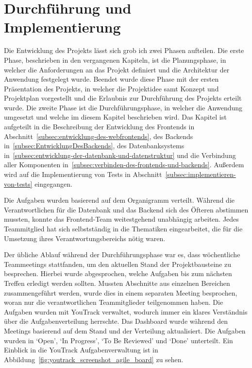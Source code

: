 \section{Durchführung und Implementierung}\label{sec:durchfuehrung-implementierung}

Die Entwicklung des Projekts lässt sich grob ich zwei Phasen aufteilen.
Die erste Phase, beschrieben in den vergangenen Kapiteln, ist die Planungsphase, in welcher die Anforderungen an das Projekt definiert und die Architektur der Anwendung festgelegt wurde.
Beendet wurde diese Phase mit der ersten Präsentation des Projekts, in welcher die Projektidee samt Konzept und Projektplan vorgestellt und die Erlaubnis zur Durchführung des Projekts erteilt wurde.
Die zweite Phase ist die Durchführungsphase, in welcher die Anwendung umgesetzt und welche im diesem Kapitel beschrieben wird.
Das Kapitel ist aufgeteilt in die Beschreibung der Entwicklung des Frontends in Abschnitt~\ref{subsec:entwicklung-des-webfrontends}, des Backends in~\ref{subsec:EntwicklungDesBackends}, des Datenbanksystems in~\ref{subsec:entwicklung-der-datenbank-und-datenstruktur} und die Verbindung aller Komponenten in~\ref{subsec:verbinden-des-frontends-und-backends}.
Außerdem wird auf die Implementierung von Tests in Abschnitt~\ref{subsec:implementieren-von-tests} eingegangen.

Die Aufgaben wurden basierend auf dem Organigramm verteilt.
Während die Verantwortlichen für die Datenbank und das Backend sich des Öfteren abstimmen mussten, konnte das Frontend-Team weitestgehend unabhängig arbeiten.
Jedes Teammitglied hat sich selbstständig in die Thematiken eingearbeitet, die für die Umsetzung ihres Verantwortungsbereichs nötig waren.

Der übliche Ablauf während der Durchführungsphase war es, dass wöchentliche Teammeetings stattfanden, um den aktuellen Stand der Projektbausteine zu besprechen.
Hierbei wurde abgesprochen, welche Aufgaben bis zum nächsten Treffen erledigt werden sollten.
Mussten Abschnitte aus einzelnen Bereichen zusammengeführt werden, wurde dies in einem separaten Meeting besprochen, woran nur die verantwortlichen Teammitglieder teilgenommen haben.
Die Aufgaben wurden mit YouTrack verwaltet, wodurch immer ein klares Verständnis über die Aufgabenverteilung herrschte.
Das Dashboard wurde während den Meetings basierend auf dem Stand und der Verteilung aktualisiert.
Die Aufgaben wurden in `Open', `In Progress', `To Be Reviewed' und `Done' unterteilt.
Ein Einblick in die YouTrack Aufgabenverwaltung ist in Abbildung~\ref{fig:youtrack_screenshot_agile_board} zu sehen.

